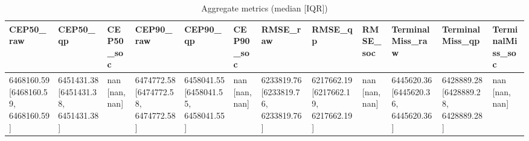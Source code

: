 \begin{table}[t]
\centering
\begin{tabular}{llllllllllll}
\toprule
CEP50_raw & CEP50_qp & CEP50_soc & CEP90_raw & CEP90_qp & CEP90_soc & RMSE_raw & RMSE_qp & RMSE_soc & TerminalMiss_raw & TerminalMiss_qp & TerminalMiss_soc \\
\midrule
6468160.59 [6468160.59, 6468160.59] & 6451431.38 [6451431.38, 6451431.38] & nan [nan, nan] & 6474772.58 [6474772.58, 6474772.58] & 6458041.55 [6458041.55, 6458041.55] & nan [nan, nan] & 6233819.76 [6233819.76, 6233819.76] & 6217662.19 [6217662.19, 6217662.19] & nan [nan, nan] & 6445620.36 [6445620.36, 6445620.36] & 6428889.28 [6428889.28, 6428889.28] & nan [nan, nan] \\
\bottomrule
\end{tabular}
\caption{Aggregate metrics (median [IQR])}
\label{tab:aggregate}
\end{table}
